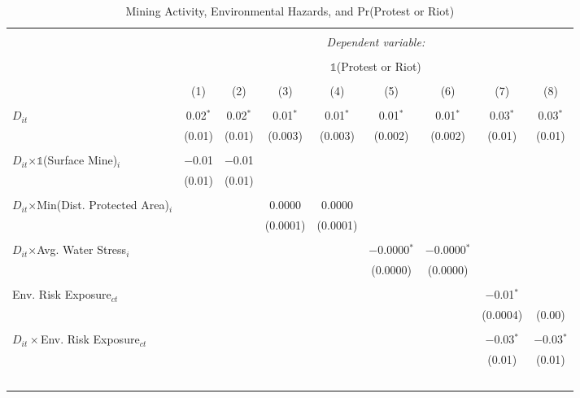 \begin{table}[ht!] \centering
  \caption{Mining Activity, Environmental Hazards, and Pr(Protest or Riot)}
  \label{tab:did_acled_environment}
\footnotesize
\begin{tabular}{@{\extracolsep{0pt}}lcccccccc}
\\[-1.8ex]\hline
\hline \\[-1.8ex]
 & \multicolumn{8}{c}{\textit{Dependent variable:}} \\
\cline{2-9}
\\[-1.8ex] & \multicolumn{8}{c}{$\mathbb{1}$(Protest or Riot)} \\
\\[-1.8ex] & (1) & (2) & (3) & (4) & (5) & (6) & (7) & (8)\\
\hline \\[-1.8ex]
 $D_{it}$ & 0.02$^{*}$ & 0.02$^{*}$ & 0.01$^{*}$ & 0.01$^{*}$ & 0.01$^{*}$ & 0.01$^{*}$ & 0.03$^{*}$ & 0.03$^{*}$ \\
  & (0.01) & (0.01) & (0.003) & (0.003) & (0.002) & (0.002) & (0.01) & (0.01) \\
  & & & & & & & & \\
 $D_{it}$$\times\mathbb{1}$(Surface Mine)$_i$ & $-$0.01 & $-$0.01 &  &  &  &  &  &  \\
  & (0.01) & (0.01) &  &  &  &  &  &  \\
  & & & & & & & & \\
 $D_{it}$$\times$Min(Dist. Protected Area)$_i$ &  &  & 0.0000 & 0.0000 &  &  &  &  \\
  &  &  & (0.0001) & (0.0001) &  &  &  &  \\
  & & & & & & & & \\
 $D_{it}$$\times$Avg. Water Stress$_i$ &  &  &  &  & $-$0.0000$^{*}$ & $-$0.0000$^{*}$ &  &  \\
  &  &  &  &  & (0.0000) & (0.0000) &  &  \\
  & & & & & & & & \\
 Env. Risk Exposure$_{ct}$ &  &  &  &  &  &  & $-$0.01$^{*}$ &  \\
  &  &  &  &  &  &  & (0.0004) & (0.00) \\
  & & & & & & & & \\
 $D_{it}\times$Env. Risk Exposure$_{ct}$ &  &  &  &  &  &  & $-$0.03$^{*}$ & $-$0.03$^{*}$ \\
  &  &  &  &  &  &  & (0.01) & (0.01) \\
$$
\end{tabular}
\end{table}
